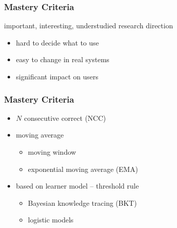 \documentclass[bigger]{beamer}
\begin{document}
\begin{frame}
  \frametitle{Mastery Criteria}

  important, interesting, understudied research direction
  
  \medskip
  
  \begin{itemize}
  \item hard to decide what to use
  \item easy to change in real systems
  \item significant impact on users
  \end{itemize}
\end{frame}


\begin{frame}
  \frametitle{Mastery Criteria}

  \begin{itemize}
  \item \alert{$N$ consecutive correct (NCC)}
  \item moving average
    \begin{itemize}
    \item moving window
    \item \alert{exponential moving average  (EMA)}
    \end{itemize}
  \item based on learner model -- threshold rule 
    \begin{itemize}
    \item \alert{Bayesian knowledge tracing (BKT)}
    \item logistic models
    \end{itemize}
  \end{itemize}

\end{frame}
\end{document}
